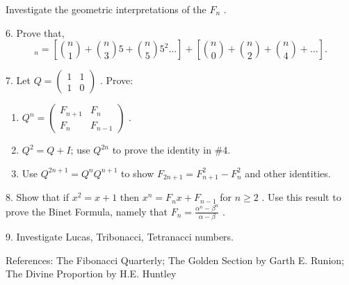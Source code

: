 \documentclass[10pt,]{book}
\theoremstyle{plain}
\theoremstyle{definition}
\theoremstyle{definition}
\numberwithin{equation}{chapter}
\newcommand{\amp}{&}
\begin{document}
\begin{exerciselist}
Investigate the geometric interpretations of the \(F_{n}\) .%
\par\smallskip
\item[6.]\hypertarget{exercise-87}{}\hypertarget{p-218}{}%
Prove that,%
\begin{equation*}
_{n} = \left\lbrack \binom{n}{1}  + \binom{n}{3} 5 + \binom{n}{5} 5^{2}\ldots \right\rbrack + \left\lbrack \binom{n}{0}  + \binom{n}{2}  + \binom{n}{4}  + \ldots \right\rbrack.
\end{equation*}
%
\par\smallskip
\item[7.]\hypertarget{exercise-88}{}\hypertarget{p-219}{}%
Let \(Q =\begin{pmatrix}1 \amp 1 \\ 1 \amp 0\end{pmatrix}\) . Prove: \leavevmode%
\begin{enumerate}[label=(\alph*)]
\item\hypertarget{li-60}{}\hypertarget{p-220}{}%
\(Q^{n} = \begin{pmatrix} F_{n + 1} \amp F_{n}\\ F_{n} \amp F_{n - 1} \end{pmatrix}\) .%
\item\hypertarget{li-61}{}\hypertarget{p-221}{}%
\(Q^{2} = Q + I\); use \(Q^{2n}\) to prove the identity in \#4.%
\item\hypertarget{li-62}{}\hypertarget{p-222}{}%
Use \(Q^{2n + 1} = Q^{n}Q^{n + 1}\) to show \(F_{2n + 1} = F_{n + 1}^{2} - F_{n}^{2}\) and other identities.%
\end{enumerate}
%
\par\smallskip
\item[8.]\hypertarget{exercise-89}{}\hypertarget{p-223}{}%
Show that if \(x^{2} = x + 1\) then \(x^{n} = F_{n}x + F_{n - 1}\) for \(n \geq 2\) . Use this result to prove the Binet Formula, namely that \(F_{n} = \frac{\alpha^{n} - \beta^{n}}{\alpha - \beta}\) .%
\par\smallskip
\item[9.]\hypertarget{exercise-90}{}\hypertarget{p-224}{}%
Investigate Lucas, Tribonacci, Tetranacci numbers.%
\par\smallskip
\end{exerciselist}
\bigbreak
\hypertarget{p-225}{}%
References: The Fibonacci Quarterly; The Golden Section by Garth E. Runion; The Divine Proportion by H.E. Huntley%
\typeout{************************************************}
\typeout{************************************************}
\end{document}
